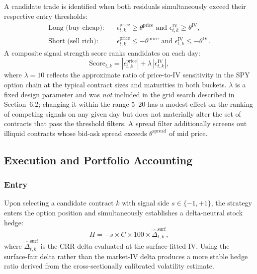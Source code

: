 \documentclass[10pt,twocolumn]{article}
\begin{document}
A candidate trade is identified when both residuals simultaneously exceed
their respective entry thresholds:
%
\begin{align}
\text{Long (buy cheap):}\quad
  &\epsilon_{t,k}^{\text{price}} \geq \theta^{\text{price}} \text{ and }
   \epsilon_{t,k}^{\text{IV}}    \geq \theta^{\text{IV}},\\[4pt]
\text{Short (sell rich):}\quad
  &\epsilon_{t,k}^{\text{price}} \leq -\theta^{\text{price}} \text{ and }
   \epsilon_{t,k}^{\text{IV}}    \leq -\theta^{\text{IV}}.
\end{align}
%
A composite signal strength score ranks candidates on each day:
%
\begin{equation}
\text{Score}_{t,k} = |\epsilon_{t,k}^{\text{price}}|
                   + \lambda\,|\epsilon_{t,k}^{\text{IV}}|,
\end{equation}
%
where $\lambda = 10$ reflects the approximate ratio of price-to-IV sensitivity
in the SPY option chain at the typical contract sizes and maturities in both
buckets.  $\lambda$ is a fixed design parameter and was \emph{not} included in
the grid search described in Section~6.2; changing it within the range 5--20
has a modest effect on the ranking of competing signals on any given day but
does not materially alter the set of contracts that pass the threshold filters.
A spread filter additionally screens out illiquid contracts whose bid-ask
spread exceeds $\theta^{\text{spread}}$ of mid price.

\subsection{Execution and Portfolio Accounting}

\subsubsection{Entry}

Upon selecting a candidate contract $k$ with signal side $s \in \{-1, +1\}$,
the strategy enters the option position and simultaneously establishes a
delta-neutral stock hedge:
%
\begin{equation}
H = -s \times C \times 100 \times \hat{\Delta}_{t,k}^{\text{surf}},
\end{equation}
%
where $\hat{\Delta}_{t,k}^{\text{surf}}$ is the CRR delta evaluated at the
surface-fitted IV. Using the surface-fair delta rather than the
market-IV delta produces a more stable hedge ratio derived from the
cross-sectionally calibrated volatility estimate.
\end{document}
